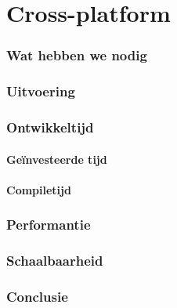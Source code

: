\section{Cross-platform}
\subsubsection{Wat hebben we nodig}

\subsubsection{Uitvoering}

\subsubsection{Ontwikkeltijd}

\paragraph{Geïnvesteerde tijd}

\paragraph{Compiletijd}

\subsubsection{Performantie}

\subsubsection{Schaalbaarheid}

\subsubsection{Conclusie}























